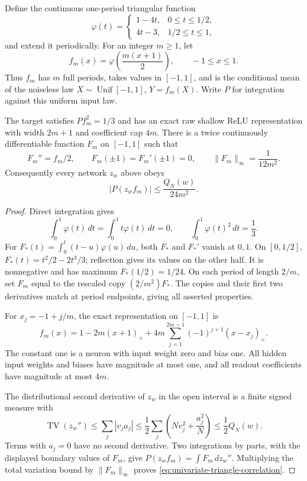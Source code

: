 Define the continuous one-period triangular function
\[
 \varphi(t)=
 \begin{cases}
  1-4t,&0\le t\le1/2,\\
  4t-3,&1/2\le t\le1,
 \end{cases}
\]
and extend it periodically. For an integer $m\ge1$, let
\[
 f_m(x)=\varphi\!\left(\frac{m(x+1)}2\right),\qquad -1\le x\le1.
\]
Thus $f_m$ has $m$ full periods, takes values in $[-1,1]$, and is
the conditional mean of the noiseless law $X\sim\operatorname{Unif}[-1,1]$,
$Y=f_m(X)$. Write $P$ for integration against this uniform input law.

\begin{lemma}
\label{lem:univariate-triangular-target}
The target satisfies $P f_m^2=1/3$ and has an exact raw shallow ReLU
representation with width $2m+1$ and coefficient cap $4m$.
There is a twice continuously differentiable function $F_m$ on
$[-1,1]$ such that
\[
 F_m''=f_m/2,\qquad F_m(\pm1)=F_m'(\pm1)=0,
 \qquad \|F_m\|_\infty=\frac{1}{12m^2}.
\]
Consequently every network $z_w$ above obeys
\begin{equation}\label{eq:univariate-triangle-correlation}
 |P(z_wf_m)|\le\frac{Q_N(w)}{24m^2}.
\end{equation}
\end{lemma}
\begin{proof}
Direct integration gives
\[
 \int_0^1\varphi(t)\,dt=\int_0^1t\varphi(t)\,dt=0,
 \qquad \int_0^1\varphi(t)^2\,dt=\frac13.
\]
For $F_*(t)=\int_0^t(t-u)\varphi(u)\,du$, both $F_*$ and
$F_*'$ vanish at $0,1$. On $[0,1/2]$,
$F_*(t)=t^2/2-2t^3/3$; reflection gives its values on the other half.
It is nonnegative and has maximum $F_*(1/2)=1/24$.
On each period of length $2/m$, set $F_m$ equal to the rescaled
copy $(2/m^2)F_*$. The copies and their first two derivatives match
at period endpoints, giving all asserted properties.

For $x_j=-1+j/m$, the exact representation on $[-1,1]$ is
\[
 f_m(x)=1-2m(x+1)_+
           +4m\sum_{j=1}^{2m-1}(-1)^{j+1}(x-x_j)_+.
\]
The constant one is a neuron with input weight zero and bias one.
All hidden input weights and biases have magnitude at most one,
and all readout coefficients have magnitude at most $4m$.

The distributional second derivative of $z_w$ in the open interval
is a finite signed measure with
\[
 \operatorname{TV}(z_w'')
 \le\sum_j|v_j a_j|
 \le\frac12\sum_j\left(Nv_j^2+\frac{a_j^2}{N}\right)
 \le\frac12Q_N(w).
\]
Terms with $a_j=0$ have no second derivative. Two integrations by
parts, with the displayed boundary values of $F_m$, give
$P(z_wf_m)=\int F_m\,d z_w''$. Multiplying the total variation
bound by $\|F_m\|_\infty$ proves
\eqref{eq:univariate-triangle-correlation}.
\end{proof}

